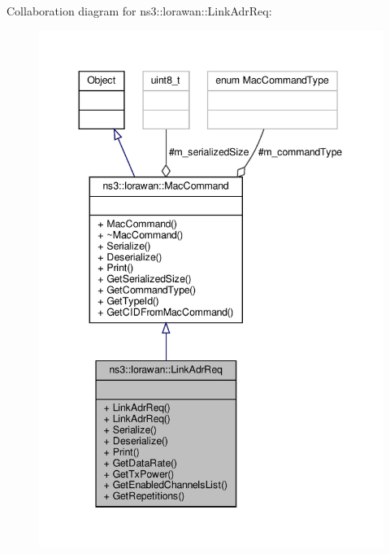 Collaboration diagram for ns3\+:\+:lorawan\+:\+:Link\+Adr\+Req\+:
\nopagebreak
\begin{figure}[H]
\begin{center}
\leavevmode
\includegraphics[width=343pt]{classns3_1_1lorawan_1_1LinkAdrReq__coll__graph}
\end{center}
\end{figure}
